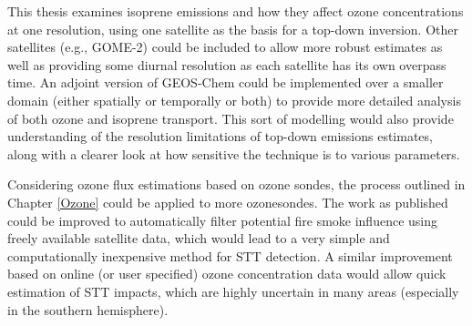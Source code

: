   This thesis examines isoprene emissions and how they affect ozone concentrations at one resolution, using one satellite as the basis for a top-down inversion.
  Other satellites (e.g., GOME-2) could be included to allow more robust estimates as well as providing some diurnal resolution as each satellite has its own overpass time.
  An adjoint version of GEOS-Chem could be implemented over a smaller domain (either spatially or temporally or both) to provide more detailed analysis of both ozone and isoprene transport.
  This sort of modelling would also provide understanding of the resolution limitations of top-down emissions estimates, along with a clearer look at how sensitive the technique is to various parameters.
  
  Considering ozone flux estimations based on ozone sondes, the process outlined in Chapter \ref{Ozone} could be applied to more ozonesondes.
  The work as published could be improved to automatically filter potential fire smoke influence using freely available satellite data, which would lead to a very simple and computationally inexpensive method for STT detection.
  A similar improvement based on online (or user specified) ozone concentration data would allow quick estimation of STT impacts, which are highly uncertain in many areas (especially in the southern hemisphere).
  